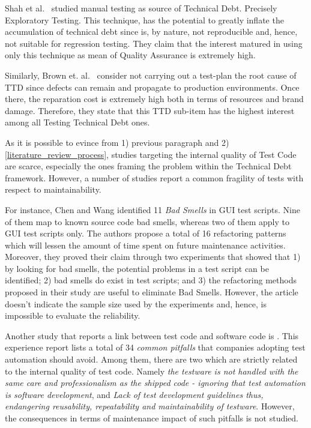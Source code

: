 Shah et al.\ \cite{exploratorying_testing_td} studied manual testing as source of Technical Debt. Precisely Exploratory Testing. This technique, has the potential to greatly inflate the accumulation of technical debt since is, by nature, not reproducible and, hence, not suitable for regression testing. They claim that the interest matured in using only this technique as mean of Quality Assurance is extremely high. 

Similarly, Brown et. al.\ \cite{td_current_vs_optimal_quality} consider not carrying out a test-plan the root cause of TTD since defects can remain and propagate to production environments. Once there, the reparation cost is extremely high both in terms of resources and brand damage. Therefore, they state that this TTD sub-item has the highest interest among all Testing Technical Debt ones.

As it is possible to evince from 1) previous paragraph and 2) \ref{literature_review_process}, studies targeting the internal quality of Test Code are scarce, especially the ones framing the problem within the Technical Debt framework. However, a number of studies report a common fragility of tests with respect to maintainability. 

For instance, Chen and Wang \cite{gui_scripts_bad_smells} identified 11 \textit{Bad Smells} in GUI test scripts. Nine of them map to known source code bad smells, whereas two of them apply to GUI test scripts only. The authors propose a total of 16 refactoring patterns which will lessen the amount of time spent on future maintenance activities. Moreover, they proved their claim through two experiments that showed that 1) by looking for bad smells, the potential problems in a test script can be identified; 2) bad smells do exist in test scripts; and 3) the refactoring methods proposed in their study are useful to eliminate Bad Smells. However, the article doesn't indicate the sample size used by the experiments and, hence, is impossible to evaluate the reliability. 

Another study that reports a link between test code and software code is \cite{pitfalls_in_introducing_regression_testing}. This experience report lists a total of 34 \textit{common pitfalls} that companies adopting test automation should avoid. Among them, there are two which are strictly related to the internal quality of test code. Namely \textit{the testware is not handled with the same care and professionalism as the shipped code - ignoring that test automation is software development}, and \textit{Lack of test development guidelines thus, endangering reusability, repeatability and maintainability of testware}. However, the consequences in terms of maintenance impact of such pitfalls is not studied. 

